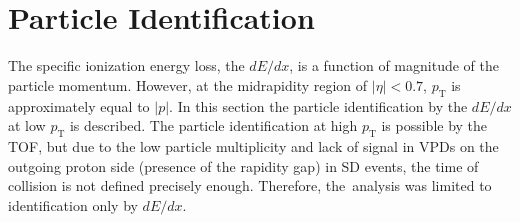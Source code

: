 \section{Particle Identification}\label{section:star_PIDdEdx}

The specific ionization energy loss, the $dE/dx$, is a function of magnitude of the
particle momentum. However, at the midrapidity region of $|\eta| < 0.7$, $p_\textrm{T}$ is approximately equal to $|p|$. In this section the particle identification by the $dE/dx$ at low $p_\textrm{T}$ is described.
The particle identification at high $p_\textrm{T}$ is possible
by the TOF, but due to the low particle multiplicity and lack of signal in VPDs on the outgoing proton side (presence of the rapidity gap) in SD events, the time of collision is not defined precisely enough. Therefore, the~analysis was limited to identification only by $dE/dx$. 

